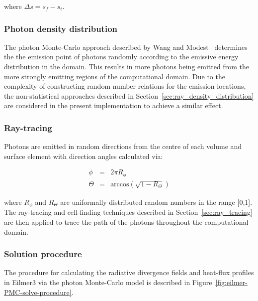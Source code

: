 \noindent where $\Delta s = s_{f} - s_{i}$.

\subsubsection{Photon density distribution}

The photon Monte-Carlo approach described by Wang and Modest~\cite{WM2007} determines the the emission point of photons randomly according to the emissive energy distribution in the domain.
This results in more photons being emitted from the more strongly emitting regions of the computational domain.
Due to the complexity of constructing random number relations for the emission locations, the non-statistical approaches described in Section~\ref{sec:ray_density_distribution} are considered in the present implementation to achieve a similar effect.

\subsubsection{Ray-tracing}

Photons are emitted in random directions from the centre of each volume and surface element with direction angles calculated via:

\begin{eqnarray}
 \phi &=& 2 \pi R_{\phi} \\
 \Theta &=& \text{arccos} \left ( \sqrt{ 1 - R_\Theta } \right )
\end{eqnarray}

\noindent where $R_{\phi}$ and $R_{\Theta}$ are uniformally distributed random numbers in the range [0,1].
The ray-tracing and cell-finding techniques described in Section~\ref{sec:ray_tracing} are then applied to trace the path of the photons throughout the computational domain.

\subsubsection{Solution procedure}

The procedure for calculating the radiative divergence fields and heat-flux profiles in Eilmer3  via the photon Monte-Carlo model is described in Figure~\ref{fig:eilmer-PMC-solve-procedure}.

